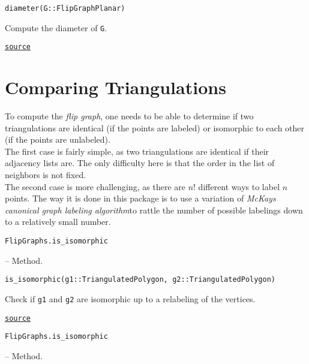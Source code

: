 \begin{adjustwidth}{2em}{0pt}


\begin{verbatim}
diameter(G::FlipGraphPlanar)
\end{verbatim}

Compute the diameter of \texttt{G}.



\href{https://github.com/schto223/FlipGraphs.jl/blob/490c01a7adf74b42f27dda05099165c47ae8133e/src/flipGraphPlanar.jl#L373-L377}{\texttt{source}}


\end{adjustwidth}

\section{Comparing Triangulations}



\label{9598979154961159507}{}


To compute the \emph{flip graph}, one needs to be able to determine if two triangulations are identical (if the points are labeled) or isomorphic to each other (if the points are unlabeled). \\
The first case is fairly simple, as two triangulations are identical if their adjacency lists are. The only difficulty here is that the order in the list of neighbors is not fixed.\\
The second case is more challenging, as there are \(n!\) different ways to label \(n\) points. The way it is done in this package is to use a variation of \emph{McKay{\textquotesingle}s canonical graph labeling algorithm}\footnotemark[1] to rattle the number of possible labelings down to a relatively small number.


\hypertarget{3606704227605247881}{\texttt{FlipGraphs.is\_isomorphic}}  -- {Method.}

\begin{adjustwidth}{2em}{0pt}


\begin{verbatim}
is_isomorphic(g1::TriangulatedPolygon, g2::TriangulatedPolygon)
\end{verbatim}

Check if \texttt{g1} and \texttt{g2} are isomorphic up to a relabeling of the vertices.



\href{https://github.com/schto223/FlipGraphs.jl/blob/490c01a7adf74b42f27dda05099165c47ae8133e/src/flipGraphPlanar.jl#L357-L361}{\texttt{source}}


\end{adjustwidth}
\hypertarget{15972932308511385085}{\texttt{FlipGraphs.is\_isomorphic}}  -- {Method.}

